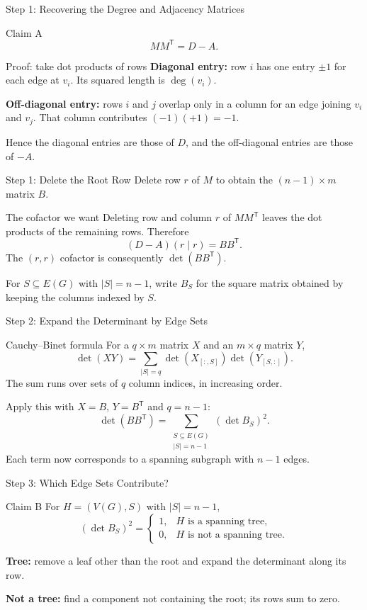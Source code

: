 \documentclass[aspectratio=169,11pt]{beamer}
\begin{document}
\begin{frame}[t]{Step 1: Recovering the Degree and Adjacency Matrices}
\begin{block}{Claim A}
\[MM^{\mathsf T}=D-A.\]
\end{block}
\begin{block}{Proof: take dot products of rows}
\textbf{Diagonal entry:} row $i$ has one entry $\pm1$ for each edge at $v_i$. Its squared length is $\deg(v_i)$.
\par\medskip
\textbf{Off-diagonal entry:} rows $i$ and $j$ overlap only in a column for an edge joining $v_i$ and $v_j$. That column contributes $(-1)(+1)=-1$.
\par\medskip
Hence the diagonal entries are those of $D$, and the off-diagonal entries are those of $-A$.
\end{block}
\end{frame}

\begin{frame}[t]{Step 1: Delete the Root Row}
Delete row $r$ of $M$ to obtain the $(n-1)\times m$ matrix $B$.
\begin{block}{The cofactor we want}
Deleting row and column $r$ of $MM^{\mathsf T}$ leaves the dot products of the remaining rows. Therefore
\[
(D-A)(r\mid r)=BB^{\mathsf T}.
\]
The $(r,r)$ cofactor is consequently $\det(BB^{\mathsf T})$.
\end{block}
\medskip
For $S\subseteq E(G)$ with $|S|=n-1$, write $B_S$ for the square matrix obtained by keeping the columns indexed by $S$.
\end{frame}

\begin{frame}[t]{Step 2: Expand the Determinant by Edge Sets}
\begin{block}{Cauchy--Binet formula}
For a $q\times m$ matrix $X$ and an $m\times q$ matrix $Y$,
\[
\det(XY)=\sum_{|S|=q}\det(X_{[:,S]})\det(Y_{[S,:]}).
\]
The sum runs over sets of $q$ column indices, in increasing order.
\end{block}
Apply this with $X=B$, $Y=B^{\mathsf T}$ and $q=n-1$:
\[
\boxed{\det(BB^{\mathsf T})=
\sum_{\substack{S\subseteq E(G)\\|S|=n-1}}(\det B_S)^2.}
\]
Each term now corresponds to a spanning subgraph with $n-1$ edges.
\end{frame}

\begin{frame}[t]{Step 3: Which Edge Sets Contribute?}
\begin{block}{Claim B}
For $H=(V(G),S)$ with $|S|=n-1$,
\[
(\det B_S)^2=
\begin{cases}
1,&H\text{ is a spanning tree},\\
0,&H\text{ is not a spanning tree}.
\end{cases}
\]
\end{block}
\medskip
\textbf{Tree:} remove a leaf other than the root and expand the determinant along its row.
\par\bigskip
\textbf{Not a tree:} find a component not containing the root; its rows sum to zero.
\end{frame}
\end{document}
